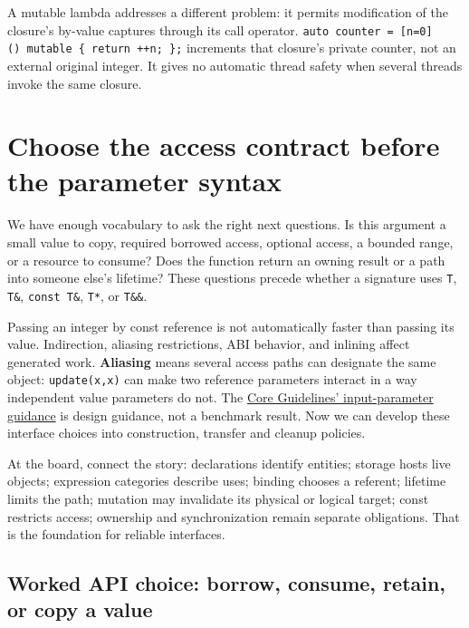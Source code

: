 A mutable lambda addresses a different problem: it permits modification of the closure's by-value captures through its call operator. \texttt{auto\ counter\ =\ {[}n=0{]}()\ mutable\ \{\ return\ ++n;\ \};} increments that closure's private counter, not an external original integer. It gives no automatic thread safety when several threads invoke the same closure.

\section{Choose the access contract before the parameter syntax}\label{05-engine-i-ch003-choose-the-access-contract-before-the-parameter-syntax}

We have enough vocabulary to ask the right next questions. Is this argument a small value to copy, required borrowed access, optional access, a bounded range, or a resource to consume? Does the function return an owning result or a path into someone else's lifetime? These questions precede whether a signature uses \texttt{T}, \texttt{T\&}, \texttt{const\ T\&}, \texttt{T*}, or \texttt{T\&\&}.

Passing an integer by const reference is not automatically faster than passing its value. Indirection, aliasing restrictions, ABI behavior, and inlining affect generated work. \textbf{Aliasing} means several access paths can designate the same object: \texttt{update(x,x)} can make two reference parameters interact in a way independent value parameters do not. The \href{https://isocpp.github.io/CppCoreGuidelines/CppCoreGuidelines\#f16-for-in-parameters-pass-cheaply-copied-types-by-value-and-others-by-reference-to-const}{Core Guidelines' input-parameter guidance} is design guidance, not a benchmark result. Now we can develop these interface choices into construction, transfer and cleanup policies.

At the board, connect the story: declarations identify entities; storage hosts live objects; expression categories describe uses; binding chooses a referent; lifetime limits the path; mutation may invalidate its physical or logical target; const restricts access; ownership and synchronization remain separate obligations. That is the foundation for reliable interfaces.

\subsection{Worked API choice: borrow, consume, retain, or copy a value}\label{05-engine-i-ch003-worked-api-choice-borrow-consume-retain-or-copy-a-value}

